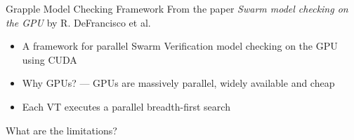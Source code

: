 \documentclass[aspectratio=169]{beamer}
\begin{document}
\begin{frame}{Grapple Model Checking Framework}
    From the paper \emph{Swarm model checking on the GPU} by R. DeFrancisco et al. \cite{DeFrancisco2020.Grapple}

    \begin{itemize}
        \item A framework for parallel Swarm Verification model checking on the GPU using CUDA
        \item Why GPUs? — GPUs are massively parallel, widely available and cheap
        \item Each VT executes a parallel breadth-first search
    \end{itemize}

    What are the limitations?
\end{frame}
\end{document}
